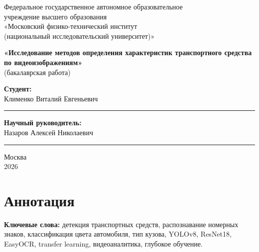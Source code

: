 \documentclass[14pt,a4paper]{report}
\numberwithin{equation}{chapter}
\numberwithin{figure}{chapter}
\numberwithin{table}{chapter}
\begin{document}
\begin{titlepage}
\begin{center}
{\small
Федеральное государственное автономное образовательное\\
учреждение высшего образования\\[4pt]
«Московский физико-технический институт\\
(национальный исследовательский университет)»
}

\vspace{5cm}

{\large\bfseries
«Исследование методов определения характеристик транспортного средства по видеоизображениям»
}\\[1.2em]
{\normalsize (бакалаврская работа)}
\end{center}

\vspace{4cm}

\hfill
\begin{minipage}{0.42\textwidth}
  \textbf{Студент:}\\
  Клименко Виталий Евгеньевич\\[1.8em]
  \rule{\linewidth}{0.4pt}
\end{minipage}

\vspace{2em}

\hfill
\begin{minipage}{0.42\textwidth}
  \textbf{Научный руководитель:}\\
  Назаров Алексей Николаевич\\[1.8em]
  \rule{\linewidth}{0.4pt}
\end{minipage}

\vfill
\begin{center}
Москва\\
2026
\end{center}
\end{titlepage}

\chapter*{Аннотация}

\noindent\textbf{Ключевые слова:} детекция транспортных средств, распознавание
номерных знаков, классификация цвета автомобиля, тип кузова, YOLOv8, ResNet18,
EasyOCR, transfer learning, видеоаналитика, глубокое обучение.
\end{document}
